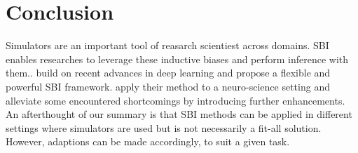 \documentclass[12pt]{article}
\begin{document}
\section*{Conclusion}




Simulators are an important tool of reasarch scientiest across domains. SBI enables researches to leverage these inductive biases and perform inference with them.. \citet{papamakarios2016fast} build on recent advances in deep learning and propose a flexible and powerful SBI framework. \citet{lueckmann2017flexible} apply their method to a neuro-science setting and alleviate some encountered shortcomings by introducing further enhancements. An afterthought of our summary is that SBI methods can be applied in different settings where simulators are used but is not necessarily a fit-all solution. However, adaptions can be made accordingly, to suit a given task.






\end{document}
